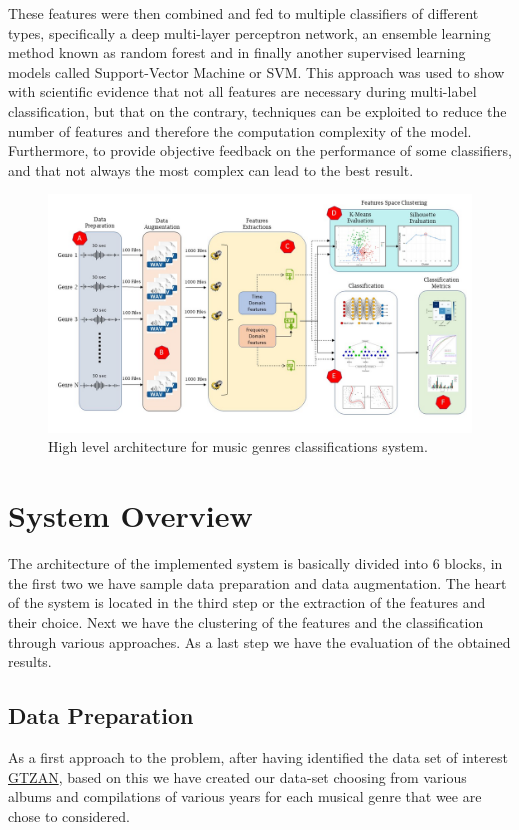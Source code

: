 \documentclass[conference]{IEEEtran}
\begin{document}
These features were then combined and fed to multiple classifiers of different types, specifically a deep multi-layer perceptron network, an ensemble learning method known as random forest and in finally another supervised learning models called Support-Vector Machine or SVM. This approach was used to show with scientific evidence that not all features are necessary during multi-label classification, but that on the contrary, techniques can be exploited to reduce the number of features and therefore the computation complexity of the model. Furthermore, to provide objective feedback on the performance of some classifiers, and that not always the most complex can lead to the best result.
\begin{figure}
    \centering
    \includegraphics[width=16cm]{Image/System_Overview.jpg}
    \caption{\label{fig:FirstArchitecture}High level architecture for music genres classifications system.}
\end{figure}

\section{System Overview}
\noindent
The architecture of the implemented system is basically divided into 6 blocks, in the first two we have sample data preparation and data augmentation. The heart of the system is located in the third step or the extraction of the features and their choice. Next we have the clustering of the features and the classification through various approaches. As a last step we have the evaluation of the obtained results.

\subsection{Data Preparation}
\noindent
As a first approach to the problem, after having identified the data set of interest \href{http://marsyas.info/downloads/datasets.html}{GTZAN}, based on this we have created our data-set choosing from various albums and compilations of various years for each musical genre that wee are chose to considered. 
\end{document}
